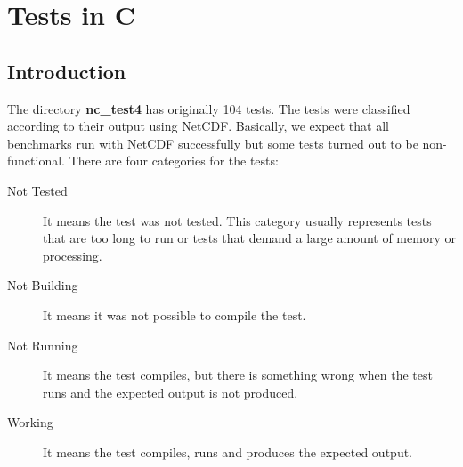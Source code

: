 \chapter{Tests in C}
\label{ch:nctests}

\section{Introduction}

The directory \textbf{nc\_test4} has originally 104 tests. The tests were classified according to their output using NetCDF. Basically, we expect that all benchmarks run with NetCDF successfully but some tests turned out to be non-functional.
There are four categories for the tests:

\begin{description}

\item[Not Tested] It means the test was not tested. This category usually represents tests that are too long to run or tests that demand a large amount of memory or processing.

\item[Not Building] It means it was not possible to compile the test.

\item[Not Running] It means the test compiles, but there is something wrong when the test runs and the expected output is not produced.

\item[Working] It means the test compiles, runs and produces the expected output.

\end{description}


